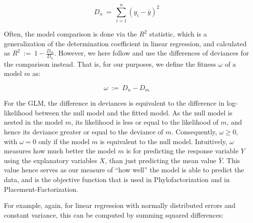 \begin{equation}
    \label{ch:Factorization:sub:GLM:eq:null_deviance}
    D_n ~=~ \sum_{i=1}^{n} \left( y_i - \bar{y} \right)^2
\end{equation}

Often, the model comparison is done via the $R^2$ statistic,
which is a generalization of the determination coefficient in linear regression,
and calculated as $R^2 ~:=~ 1 - \frac{D_m}{D_n}$.
However, we here follow  and use the differences of deviances for the comparison instead.
That is, for our purposes, we define the fitness $\omega$ of a model $m$ as:

\begin{equation}
    \label{ch:Factorization:sub:GLM:eq:deviancedifference}
    \omega ~:=~ D_n - D_m
\end{equation}


For the \ac{GLM}, the difference in deviances is equivalent to the difference in log-likelihood
between the null model and the fitted model.
As the null model is nested in the model $m$, its likelihood is less or equal to the likelihood of $m$,
and hence its deviance greater or equal to the deviance of $m$.
Consequently, $\omega \geq 0$, with $\omega = 0$ only if the model $m$ is equivalent to the null model.
Intuitively, $\omega$ measures how much better the model $m$ is for predicting the response variable $Y$
using the explanatory variables $X$, than just predicting the mean value $\bar{Y}$.
This value hence serves as our measure of ``how well'' the model is able to predict the data,
and is the objective function that is used in Phylofactorization and in Placement-Factorization.

For example, again, for linear regression with normally distributed errors and constant variance,
this can be computed by summing squared differences:

